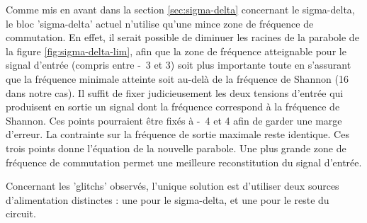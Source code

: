 Comme mis en avant dans la section \ref{sec:sigma-delta} concernant le
sigma-delta, le bloc 'sigma-delta' actuel n'utilise qu'une mince zone
de fréquence de commutation. En effet, il serait possible de diminuer
les racines de la parabole de la figure \ref{fig:sigma-delta-lim}, 
afin que la zone de fréquence atteignable pour le signal d'entrée 
(compris entre \unit{-3}{\volt} et \unit{3}{\volt})
soit plus importante toute en s'assurant que la fréquence minimale
atteinte soit au-delà de la fréquence de Shannon (\unit{16}{\kilo\hertz} dans
notre cas). Il suffit de fixer judicieusement les deux tensions d'entrée qui produisent
en sortie un signal dont la fréquence correspond à la fréquence de Shannon. 
Ces points pourraient être fixés à \unit{-4}{\volt} et \unit{4}{\volt}
afin de garder une marge d'erreur. La contrainte sur la fréquence
de sortie maximale reste identique.
Ces trois points donne l'équation de la nouvelle parabole. Une plus 
grande zone de fréquence de commutation permet une meilleure reconstitution
du signal d'entrée.

Concernant les 'glitchs' observés, l'unique solution est d'utiliser deux 
sources d'alimentation distinctes : une pour le sigma-delta, et une pour le reste du circuit.